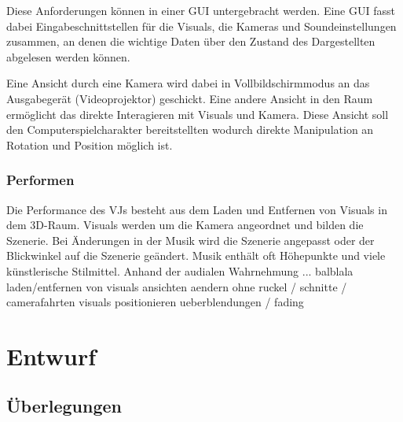 Diese Anforderungen k\"onnen in einer GUI untergebracht werden. Eine GUI fasst dabei Eingabeschnittstellen f\"ur die Visuals,
die Kameras und Soundeinstellungen zusammen, an denen die wichtige Daten \"uber den Zustand des Dargestellten abgelesen
werden k\"onnen.

Eine Ansicht durch eine Kamera wird dabei in Vollbildschirmmodus an das Ausgabeger\"at (Videoprojektor) geschickt. Eine 
andere Ansicht in den Raum erm\"oglicht das direkte Interagieren mit Visuals und Kamera. Diese Ansicht soll den
Computerspielcharakter bereitstellten wodurch direkte Manipulation an Rotation und Position m\"oglich ist.





\subsubsection{Performen}

Die Performance des VJs besteht aus dem Laden und Entfernen von Visuals in dem 3D-Raum. Visuals werden um die
Kamera angeordnet und bilden die Szenerie. Bei \"Anderungen in der Musik wird die Szenerie angepasst oder der
Blickwinkel auf die Szenerie ge\"andert. Musik enth\"alt oft H\"ohepunkte und viele k\"unstlerische Stilmittel.
Anhand der audialen Wahrnehmung ... balblala
laden/entfernen von visuals
ansichten aendern ohne ruckel / schnitte / camerafahrten
visuals positionieren
ueberblendungen / fading





\section{Entwurf}

\subsection{\"Uberlegungen}

